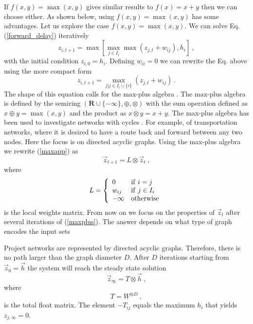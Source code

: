 \documentclass[reprint,aps,prl,amsmath,amssymb,superscriptaddress,showpacs]{revtex4-1}
\begin{document}
If $f(x,y)=\max(x,y)$ gives similar results to $f(x)=x+y$ then we can choose either. As shown below, using  $f(x,y)=\max(x,y)$ has some advantages. Let us explore the case $f(x,y)=\max(x,y)$. We can solve Eq. (\ref{forward_delay}) iteratively
%
\begin{equation}
z_{i,t+1} = \max\left[ \max_{j\in I_i} \max(z_{j,t} + w_{ij}), h_i\right]\ ,
\label{forward_delay_iter} 
\end{equation}
%
with the initial condition $z_{i,0}=h_i$. Defining $w_{ii}=0$ we can rewrite the Eq. above using the more compact form
%
\begin{equation}
z_{i,t+1} = \max_{j|j\in I_i\cup\{i\}} ( z_{j,t} + w_{ij})\ .
\label{maxapp}
\end{equation}
%
The shape of this equation calls for the max-plus algebra \cite{butkovic10}. The max-plus algebra is defined by the semiring $(\mathbf{R}\cup\{-\infty\},\oplus,\otimes)$ with the sum operation defined as
$x\oplus y = \max(x,y)$ and the product as $x\otimes y = x+y$. The max-plus algebra has been used to investigate networks with cycles \cite{hei14}. For example, of transportation networks, where it is desired to have a route back and forward between any two nodes. Here the focus is on directed acyclic graphs. Using the max-plus algebra we rewrite  (\ref{maxapp}) as
%
\begin{equation}
\vec{z}_{t+1} = L\otimes \vec{z}_t\ ,
\label{maxplus} 
\end{equation}
%
where
%
\begin{equation}
L = \left\{
\begin{array}{ll}
0 & {\rm if}\ i=j\\
w_{ij} & {\rm if}\ j\in I_i\\
-\infty & {\rm otherwise}
\end{array}\right.
\label{L}
\end{equation}
%
is the local weights matrix. From now on we focus on the properties of $\vec{z}_t$ after several iterations of (\ref{maxplus}). The answer depends on what type of graph encodes the input sets 

Project networks are represented by directed acyclic graphs. Therefore, there is no path larger than the graph diameter $D$. After $D$ iterations starting from $\vec{z}_0=\vec{h}$ the system will reach the steady state solution
%
\begin{equation}
\vec{z}_{\infty} = T\otimes \vec{h}\ ,
\label{maxplus_oo} 
\end{equation}
%
where
%
\begin{equation}
T = W^{\otimes D}\ ,
\label{T}
\end{equation}
%
is the total float matrix. The element $-T_{ij}$ equals the maximum $h_i$ that yields $z_{j,\infty}=0$.
\end{document}
